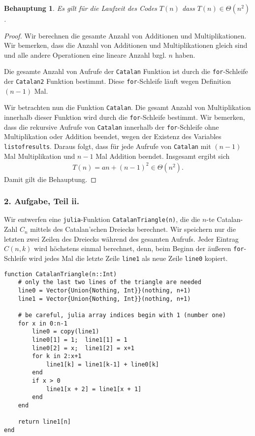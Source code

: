 \documentclass[draft,a5paper]{article}
\newtheorem*{beh}{Behauptung}
\begin{document}
\begin{beh}
  Es gilt für die Laufzeit des Codes \(T(n)\) dass
  \(T(n) \in \Theta(n^{2})\).
\end{beh}

\begin{proof}
  Wir berechnen die gesamte Anzahl von Additionen und
  Multiplikationen.  Wir bemerken, dass die Anzahl von Additionen und
  Multiplikationen gleich sind und alle andere Operationen eine
  lineare Anzahl bzgl. \(n\) haben.

  Die gesamte Anzahl von Aufrufe der \texttt{Catalan} Funktion ist
  durch die \texttt{for}-Schleife der \texttt{Catalan2} Funktion
  bestimmt.  Diese \texttt{for}-Schleife läuft wegen Definition
  \((n-1)\) Mal.

  Wir betrachten nun die Funktion \texttt{Catalan}. Die gesamt Anzahl
  von Multiplikation innerhalb dieser Funktion wird durch die
  \texttt{for}-Schleife bestimmt.  Wir bemerken, dass die rekursive
  Aufrufe von \texttt{Catalan} innerhalb der \texttt{for}-Schleife
  ohne Multiplikation oder Addition beendet, wegen der Existenz des
  Variables \texttt{list\textunderscore of\textunderscore results}.
  Daraus folgt, dass für jede Aufrufe von \texttt{Catalan} mit
  \((n-1)\) Mal Multiplikation und \(n-1\) Mal Addition beendet.
  Insgesamt ergibt sich
  \begin{align*}
    T(n) = an + (n-1)^{2} \in \Theta(n^{2}).
  \end{align*}
  Damit gilt die Behauptung.
\end{proof}

\subsubsection*{2. Aufgabe, Teil ii.}

Wir entwerfen eine \texttt{julia}-Funktion
\texttt{CatalanTriangle(n)}, die die \(n\)-te Catalan-Zahl \(C_{n}\)
mittels des Catalan'schen Dreiecks berechnet.  Wir speichern nur die
letzten zwei Zeilen des Dreiecks während des gesamten Aufrufs.  Jeder
Eintrag \(C(n, k)\) wird höchstens einmal berechnet, denn, beim Beginn
der äußeren \texttt{for}-Schleife wird jedes Mal die letzte Zeile
\texttt{line1} als neue Zeile \texttt{line0} kopiert.

\begin{verbatim}
function CatalanTriangle(n::Int)
    # only the last two lines of the triangle are needed
    line0 = Vector{Union{Nothing, Int}}(nothing, n+1)
    line1 = Vector{Union{Nothing, Int}}(nothing, n+1)

    # be careful, julia array indices begin with 1 (number one)
    for x in 0:n-1
        line0 = copy(line1)
        line0[1] = 1;  line1[1] = 1
        line0[2] = x;  line1[2] = x+1
        for k in 2:x+1
            line1[k] = line1[k-1] + line0[k]
        end
        if x > 0
            line1[x + 2] = line1[x + 1]
        end
    end

    return line1[n]
end
\end{verbatim}
\end{document}
